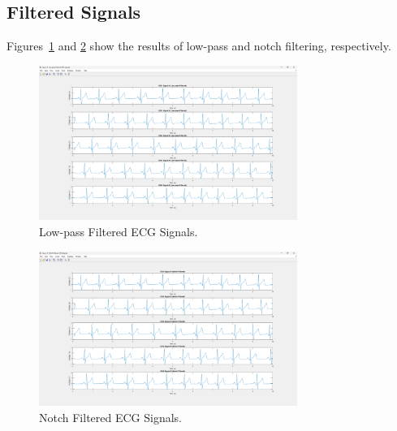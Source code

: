 \documentclass[11pt]{article}
\begin{document}
\subsection{Filtered Signals}
Figures~\ref{fig:lowpassfiltered} and \ref{fig:notchfiltered} show the results of low-pass and notch filtering, respectively.
\begin{figure}[H]
  \centering
  \includegraphics[width=0.75\textwidth]{photos/Figure_5_Low_Pass_Filtered_ECG_Signals.png}
  \caption{Low-pass Filtered ECG Signals.}
  \label{fig:lowpassfiltered}
\end{figure}
\begin{figure}[H]
  \centering
  \includegraphics[width=0.75\textwidth]{photos/Figure_6_Notch_Filtered_ECG_Signals.png}
  \caption{Notch Filtered ECG Signals.}
  \label{fig:notchfiltered}
\end{figure}
\end{document}
